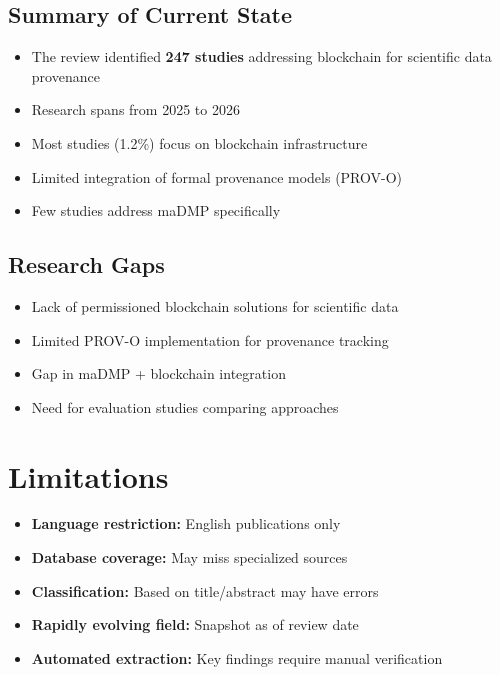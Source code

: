 \documentclass{article}
\begin{document}
\subsection{Summary of Current State}

\begin{itemize}
    \item The review identified \textbf{247 studies} addressing blockchain for scientific data provenance
    \item Research spans from 2025 to 2026
    \item Most studies (1.2\%) focus on blockchain infrastructure
    \item Limited integration of formal provenance models (PROV-O)
    \item Few studies address maDMP specifically
\end{itemize}

\subsection{Research Gaps}

\begin{itemize}
    \item Lack of permissioned blockchain solutions for scientific data
    \item Limited PROV-O implementation for provenance tracking
    \item Gap in maDMP + blockchain integration
    \item Need for evaluation studies comparing approaches
\end{itemize}

\section{Limitations}

\begin{itemize}
    \item \textbf{Language restriction:} English publications only
    \item \textbf{Database coverage:} May miss specialized sources
    \item \textbf{Classification:} Based on title/abstract may have errors
    \item \textbf{Rapidly evolving field:} Snapshot as of review date
    \item \textbf{Automated extraction:} Key findings require manual verification
\end{itemize}
\end{document}
